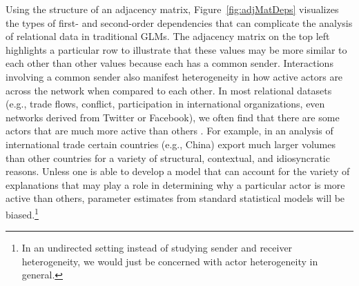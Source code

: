 \documentclass[12pt]{amsart}
\begin{document}
Using the structure of an adjacency matrix, Figure~\ref{fig:adjMatDeps} visualizes the types of first- and second-order dependencies that can complicate the analysis of relational data in traditional GLMs. The adjacency matrix on the top left highlights a particular row to illustrate that these values may be more similar to each other than other values because each has a common sender. Interactions involving a common sender also manifest heterogeneity in how active actors are across the network when compared to each other. In most relational datasets (e.g., trade flows, conflict, participation in international organizations, even networks derived from Twitter or Facebook), we often find that there are some actors that are much more active than others \citep{barabasi:reka:1999}. For example, in an analysis of international trade certain countries (e.g., China) export much larger volumes than other countries for a variety of structural, contextual, and idiosyncratic reasons. Unless one is able to develop a model that can account for the variety of explanations that may play a role in determining why a particular actor is more active than others, parameter estimates from standard statistical models will be biased.\footnote{In an undirected setting instead of studying sender and receiver heterogeneity, we would just be concerned with actor heterogeneity in general.}
\end{document}
